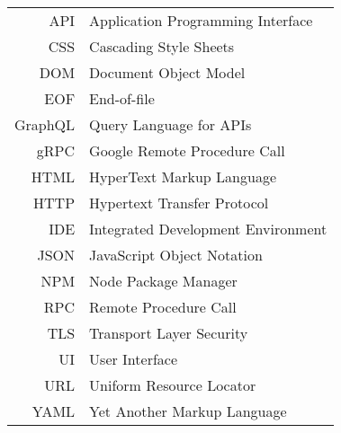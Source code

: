 \documentclass[english,master,unicode]{ctufit-thesis}
\begin{document}


    \chapter{\thectufitabbreviationlabel}

    \begin{tabular}{rl}
        API     & Application Programming Interface  \\
        CSS     & Cascading Style Sheets             \\
        DOM     & Document Object Model              \\
        EOF     & End-of-file                        \\
        GraphQL & Query Language for APIs            \\
        gRPC    & Google Remote Procedure Call       \\
        HTML    & HyperText Markup Language          \\
        HTTP    & Hypertext Transfer Protocol        \\
        IDE     & Integrated Development Environment \\
        JSON    & JavaScript Object Notation         \\
        NPM     & Node Package Manager               \\
        RPC     & Remote Procedure Call              \\
        TLS     & Transport Layer Security           \\
        UI      & User Interface                     \\
        URL     & Uniform Resource Locator           \\
        YAML    & Yet Another Markup Language        \\
    \end{tabular}
\end{document}
